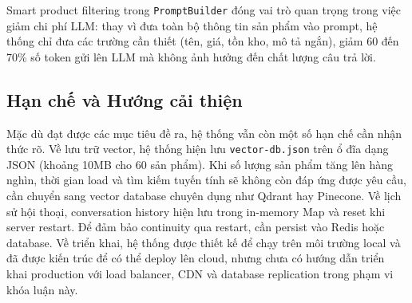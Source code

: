 Smart product filtering trong \texttt{PromptBuilder} đóng vai trò quan trọng trong việc giảm chi phí LLM: thay vì đưa toàn bộ thông tin sản phẩm vào prompt, hệ thống chỉ đưa các trường cần thiết (tên, giá, tồn kho, mô tả ngắn), giảm 60 đến 70\% số token gửi lên LLM mà không ảnh hưởng đến chất lượng câu trả lời.

\subsection{Hạn chế và Hướng cải thiện}

Mặc dù đạt được các mục tiêu đề ra, hệ thống vẫn còn một số hạn chế cần nhận thức rõ. Về lưu trữ vector, hệ thống hiện lưu \texttt{vector-db.json} trên ổ đĩa dạng JSON (khoảng 10MB cho 60 sản phẩm). Khi số lượng sản phẩm tăng lên hàng nghìn, thời gian load và tìm kiếm tuyến tính sẽ không còn đáp ứng được yêu cầu, cần chuyển sang vector database chuyên dụng như Qdrant hay Pinecone. Về lịch sử hội thoại, conversation history hiện lưu trong in-memory Map và reset khi server restart. Để đảm bảo continuity qua restart, cần persist vào Redis hoặc database. Về triển khai, hệ thống được thiết kế để chạy trên môi trường local và đã được kiến trúc để có thể deploy lên cloud, nhưng chưa có hướng dẫn triển khai production với load balancer, CDN và database replication trong phạm vi khóa luận này.
